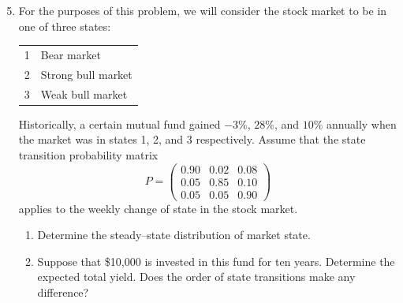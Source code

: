 \documentclass[12pt, oneside]{book}
\newenvironment{solution}{\textit{Solution.}}
\newcommand{\sol}[1]{
    \begin{customframedproof}[linecolor=orangehdx!75,]
        \begin{solution}
        #1
        \end{solution}
    \end{customframedproof}
}
\begin{document}
\begin{enumerate}
    \setcounter{enumi}{4}
    \item For the purposes of this problem, we will consider the stock market to be in one of three states:
    \begin{center}
        \begin{tabular}{ll}
            1 & Bear market \\
            2 & Strong bull market \\
            3 & Weak bull market
        \end{tabular}
    \end{center}
    Historically, a certain mutual fund gained \(-3\)\%, \(28\)\%, and \(10\%\) annually when the market was in states 1, 2, and 3 respectively. Assume that the state transition probability matrix
    \[
        P = \begin{pmatrix}
            0.90 & 0.02 & 0.08 \\
            0.05 & 0.85 & 0.10 \\
            0.05 & 0.05 & 0.90
        \end{pmatrix}
    \]
    applies to the weekly change of state in the stock market.
    \begin{enumerate}
        \item Determine the steady–state distribution of market state.
        \item Suppose that \$10,000 is invested in this fund for ten years. Determine the expected total yield. Does the order of state transitions make any difference?


\end{enumerate}
\end{enumerate}
\end{document}

